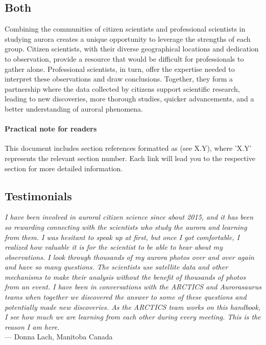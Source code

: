\documentclass{article}
\begin{document}
\subsection{Both}
Combining the communities of citizen scientists and professional scientists in studying aurora creates a unique opportunity to leverage the strengths of each group. Citizen scientists, with their diverse geographical locations and dedication to observation, provide a resource that would be difficult for professionals to gather alone. Professional scientists, in turn, offer the expertise needed to interpret these observations and draw conclusions. Together, they form a partnership where the data collected by citizens support scientific research, leading to new discoveries, more thorough studies, quicker advancements, and a better understanding of auroral phenomena.

\paragraph{Practical note for readers} This document includes section references formatted as (see X.Y), where 'X.Y' represents the relevant section number. Each link will lead you to the respective section for more detailed information.

\subsection{Testimonials}

\textit{I have been involved in auroral citizen science since about 2015, and it has been so rewarding connecting with the scientists who study the aurora and learning from them. I was hesitant to speak up at first, but once I got comfortable, I realized how valuable it is for the scientist to be able to hear about my observations. I look through thousands of my aurora photos over and over again and have so many questions. The scientists use satellite data and other mechanisms to make their analysis without the benefit of thousands of photos from an event. I have been in conversations with the ARCTICS and Aurorasaurus teams when together we discovered the answer to some of these questions and potentially made new discoveries. As the ARCTICS team works on this handbook, I see how much we are learning from each other during every meeting. This is the reason I am here.
}\\
--- Donna Lach, Manitoba Canada\\
\end{document}
